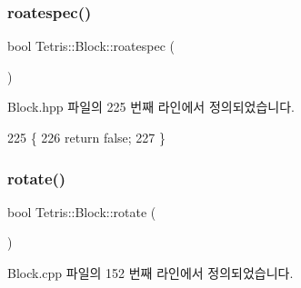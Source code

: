 \subsubsection{\texorpdfstring{roatespec()}{roatespec()}\hspace{0.1cm}{\footnotesize\ttfamily [2/2]}}
{\footnotesize\ttfamily bool Tetris\+::\+Block\+::roatespec (\begin{DoxyParamCaption}{ }\end{DoxyParamCaption})\hspace{0.3cm}{\ttfamily [inline]}}



Block.\+hpp 파일의 225 번째 라인에서 정의되었습니다.


\begin{DoxyCode}
225                             \{
226                 \textcolor{keywordflow}{return} \textcolor{keyword}{false};
227             \}
\end{DoxyCode}
\mbox{\label{class_tetris_1_1_block_a0d1eb57e6da91832ad983f7a4fa9ca04}} 
\subsubsection{\texorpdfstring{rotate()}{rotate()}\hspace{0.1cm}{\footnotesize\ttfamily [1/2]}}
{\footnotesize\ttfamily bool Tetris\+::\+Block\+::rotate (\begin{DoxyParamCaption}{ }\end{DoxyParamCaption})}



Block.\+cpp 파일의 152 번째 라인에서 정의되었습니다.


